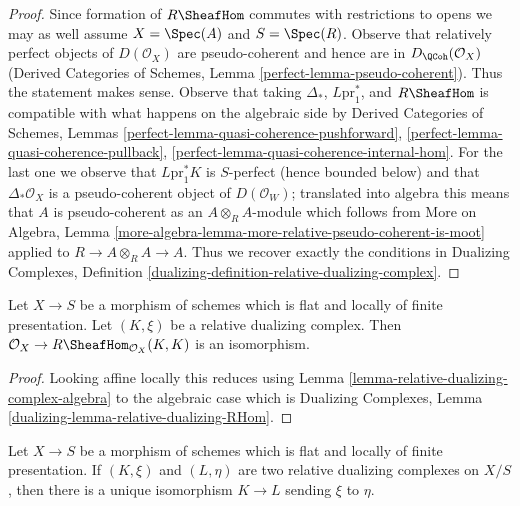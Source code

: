 \begin{proof}
Since formation of $R\SheafHom$ commutes with restrictions to
opens we may as well assume $X = \Spec(A)$ and $S = \Spec(R)$.
Observe that relatively perfect objects of $D(\mathcal{O}_X)$
are pseudo-coherent and hence are in $D_\QCoh(\mathcal{O}_X)$
(Derived Categories of Schemes, Lemma \ref{perfect-lemma-pseudo-coherent}).
Thus the statement makes sense.
Observe that taking $\Delta_*$, $L\text{pr}_1^*$, and
$R\SheafHom$ is compatible with what happens on the algebraic
side by
Derived Categories of Schemes,
Lemmas \ref{perfect-lemma-quasi-coherence-pushforward},
\ref{perfect-lemma-quasi-coherence-pullback},
\ref{perfect-lemma-quasi-coherence-internal-hom}.
For the last one we observe that $L\text{pr}_1^*K$
is $S$-perfect (hence bounded below) and that $\Delta_*\mathcal{O}_X$
is a pseudo-coherent object of $D(\mathcal{O}_W)$;
translated into algebra this means that $A$ is pseudo-coherent
as an $A \otimes_R A$-module which follows from
More on Algebra, Lemma
\ref{more-algebra-lemma-more-relative-pseudo-coherent-is-moot}
applied to $R \to A \otimes_R A \to A$.
Thus we recover exactly the conditions in
Dualizing Complexes, Definition
\ref{dualizing-definition-relative-dualizing-complex}.
\end{proof}

\begin{lemma}
\label{lemma-relative-dualizing-RHom}
Let $X \to S$ be a morphism of schemes which is flat and
locally of finite presentation. Let $(K, \xi)$ be a relative
dualizing complex. Then
$\mathcal{O}_X \to R\SheafHom_{\mathcal{O}_X}(K, K)$
is an isomorphism.
\end{lemma}

\begin{proof}
Looking affine locally this reduces using
Lemma \ref{lemma-relative-dualizing-complex-algebra}
to the algebraic case which is
Dualizing Complexes, Lemma \ref{dualizing-lemma-relative-dualizing-RHom}.
\end{proof}

\begin{lemma}
\label{lemma-uniqueness-relative-dualizing}
Let $X \to S$ be a morphism of schemes which is flat and
locally of finite presentation. If $(K, \xi)$ and $(L, \eta)$
are two relative dualizing complexes on $X/S$, then there is a unique
isomorphism $K \to L$ sending $\xi$ to $\eta$.
\end{lemma}

